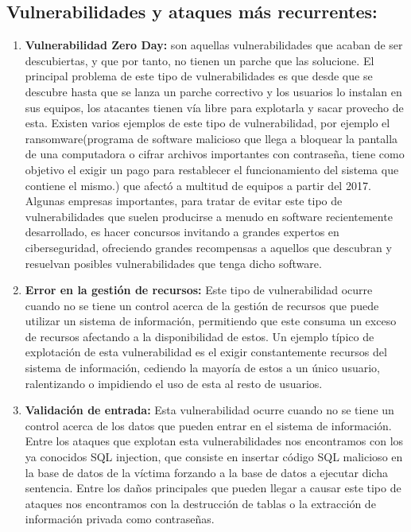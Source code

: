 \subsection{Vulnerabilidades y ataques más recurrentes:}
\begin{enumerate}
\item {\bfseries Vulnerabilidad Zero Day:}
son aquellas vulnerabilidades que acaban de ser descubiertas, y que por tanto, no tienen un parche que las solucione.
El principal problema de este tipo de vulnerabilidades es que desde que se descubre hasta que se lanza un parche correctivo y los usuarios lo instalan en sus equipos, los atacantes tienen vía libre para explotarla y sacar provecho de esta.
Existen varios ejemplos de este tipo de vulnerabilidad, por ejemplo el ransomware(programa de software malicioso que llega a bloquear la pantalla de una computadora o cifrar archivos importantes con contraseña, tiene como objetivo el exigir un pago para restablecer el funcionamiento del sistema que contiene el mismo.) que afectó a multitud de equipos a partir del 2017.
Algunas empresas importantes, para tratar de evitar este tipo de vulnerabilidades que suelen producirse a menudo en software recientemente desarrollado, es hacer concursos invitando a grandes  expertos en ciberseguridad, ofreciendo grandes recompensas a aquellos que descubran y resuelvan posibles vulnerabilidades que tenga dicho software.

\item {\bfseries Error en la gestión de recursos:}
Este tipo de vulnerabilidad ocurre cuando no se tiene un control acerca de la gestión de recursos que puede utilizar un sistema de información, permitiendo que este consuma un exceso de recursos afectando a la disponibilidad de estos.
Un ejemplo típico de explotación de esta vulnerabilidad es el exigir constantemente recursos del sistema de información, cediendo la mayoría de estos a un único usuario, ralentizando o impidiendo el uso de esta al resto de usuarios.

\item {\bfseries Validación de entrada:}
Esta vulnerabilidad ocurre cuando no se tiene un control acerca de los datos que pueden entrar en el sistema de información.
Entre los ataques que explotan esta vulnerabilidades nos encontramos con los ya conocidos SQL injection, que consiste en insertar código SQL malicioso en la base de datos de la víctima forzando a la base de datos a ejecutar dicha sentencia.
Entre los daños principales que pueden llegar a causar este tipo de ataques nos encontramos con la destrucción de tablas o la extracción de información privada como contraseñas.


\end{enumerate}
